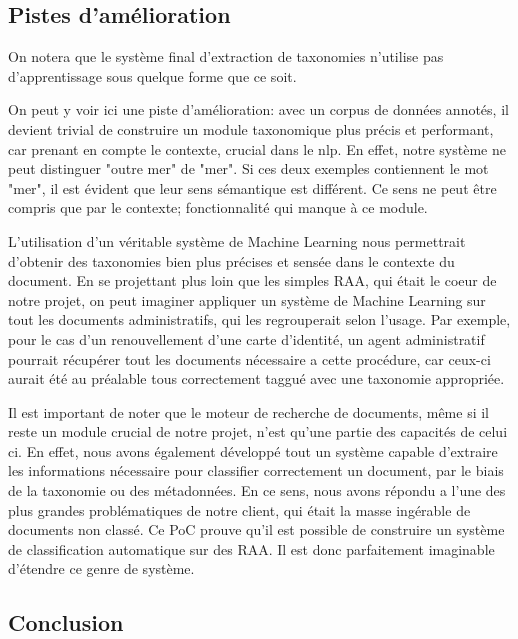 
\subsection {Pistes d'amélioration}
On notera que le système final d'extraction de taxonomies n'utilise pas d'apprentissage sous quelque forme que ce soit.

On peut y voir ici une piste d'amélioration: avec un corpus de données annotés, il devient trivial de construire un module taxonomique plus précis et performant, car prenant en compte le contexte, crucial dans le \gls{nlp}.
En effet, notre système ne peut distinguer "outre mer" de "mer". Si ces deux exemples contiennent le mot "mer", il est évident que leur sens sémantique est différent. Ce sens ne peut être compris que par le contexte; fonctionnalité qui manque à ce module. 

L'utilisation d'un véritable système de Machine Learning nous permettrait d'obtenir des taxonomies bien plus précises et sensée dans le contexte du document. En se projettant plus loin que les simples RAA, qui était le coeur de notre projet, on peut imaginer appliquer un système de Machine Learning sur tout les documents administratifs, qui les regrouperait selon l'usage. Par exemple, pour le cas d'un renouvellement d'une carte d'identité, un agent administratif pourrait récupérer tout les documents nécessaire a cette procédure, car ceux-ci aurait été au préalable tous correctement taggué avec une taxonomie appropriée. 

Il est important de noter que le moteur de recherche de documents, même si il reste un module crucial de notre projet, n'est qu'une partie des capacités de celui ci. En effet, nous avons également développé tout un système capable d'extraire les informations nécessaire pour classifier correctement un document, par le biais de la taxonomie ou des métadonnées. En ce sens, nous avons répondu a l'une des plus grandes problématiques de notre client, qui était la masse ingérable de documents non classé. Ce PoC prouve qu'il est possible de construire un système de classification automatique sur des RAA. Il est donc parfaitement imaginable d'étendre ce genre de système.

\subsection {Conclusion}




